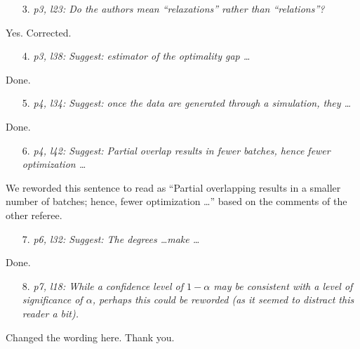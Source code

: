 \documentclass[11pt,notitlepage,onecolumn]{article}
\begin{document}
\begin{itemize}
\item[3.] \textit{p3, l23: Do the authors mean ``relaxations'' rather than ``relations''?}
\end{itemize}

\noindent 
Yes. Corrected. 
\medskip 


\begin{itemize}
\item[4.] \textit{p3, l38: Suggest: estimator of the optimality gap \ldots}
\end{itemize}

\noindent 
Done. 
\medskip 


\begin{itemize}
\item[5.] \textit{p4, l34: Suggest: once the data are generated through a simulation, they \ldots}
\end{itemize}

\noindent 
Done. 
\medskip 


\begin{itemize}
\item[6.] \textit{p4, l42: Suggest: Partial overlap results in fewer batches, hence fewer optimization \ldots}
\end{itemize}

\noindent 
We reworded this sentence to read as ``Partial overlapping results in a smaller number of batches; hence, fewer optimization \ldots '' based on the comments of the other referee.
\medskip 


\begin{itemize}
\item[7.] \textit{p6, l32: Suggest: The degrees \ldots make \ldots}
\end{itemize}

\noindent 
Done. 
\medskip 


\begin{itemize}
\item[8.] \textit{p7, l18: While a confidence level of $1-\alpha$ may be consistent with a level of significance of $\alpha$, perhaps this could be reworded (as it seemed to distract this reader a bit).}
\end{itemize}

\noindent  
Changed the wording here. Thank you. 
\medskip 
\end{document}
